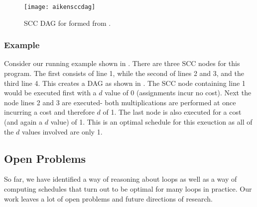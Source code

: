 
\begin{figure}[H]
\centering
\begin{minipage}{0.50\textwidth}
\texttt{[image: aikensccdag]} 
\end{minipage}
\caption{SCC DAG for  formed from .}
\label{fig:aikensccdag} 
\end{figure}

\subsubsection{Example} Consider our running example shown in . There are three SCC nodes for this program. 
The first consists of line 1, while the second of lines 2 and 3, and the third line 4. This creates 
a DAG as shown in . The SCC node containing line 1 would be executed first 
with a $d$ value of 0 (assignments incur no cost). Next the node lines 2 and 3 are executed- both multiplications 
are performed at once incurring a cost and therefore $d$ of 1. The last node is also executed for a cost 
(and again a $d$ value) of 1. This is an optimal schedule for this exeuction as all of the 
$d$ values involved are only 1.

\subsection{Open Problems}

So far, we have identified a way of reasoning about loops as well as a way of computing schedules that turn out to be optimal 
for many loops in practice. Our work leaves a lot of open problems and future directions of research.

